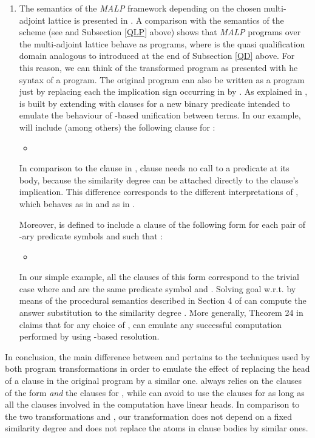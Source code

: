\documentclass{sigplanconf}
\newcommand{\MALP}{{\em MALP }}
\theoremstyle{definition}
\theoremstyle{plain}
\begin{document}
\begin{enumerate}
    \item The semantics of the \MALP framework depending on the chosen multi-adjoint lattice is presented in \cite{MOV04}. A comparison
with the semantics of the  scheme (see \cite{RR08} and Subsection \ref{QLP} above) shows that \MALP programs over the multi-adjoint lattice  behave as  programs, where  is the quasi qualification domain analogous to  introduced at the end of Subsection \ref{QD} above. For this reason, we can think of the transformed program  as presented with he syntax of a  program. The original program  can also be  written as a  program just by replacing each the implication sign  occurring  in  by . As explained in \cite{MOV04},  is built by extending  with clauses for  a new binary predicate  intended to emulate the behaviour of -based unification between terms. In our example,  will include (among others) the following clause
for :
    \begin{itemize}
        \item 
    \end{itemize}
In comparison to the clause   in , clause  needs no call to a  predicate at its body, because the similarity degree  can be attached directly to the clause's implication. This difference corresponds to the different interpretations of , which behaves as  in  and as  in .

Moreover,  is defined to include a clause of the following form for each pair of -ary predicate symbols  and  such that :
\begin{itemize}
    \item 
\end{itemize}
In our simple example, all the clauses of this form correspond to the trivial case where  and  are the same predicate symbol and . Solving goal  w.r.t. by means of the procedural semantics described in Section 4 of \cite{MOV04}
can compute the answer substitution  to the similarity degree . More generally, Theorem 24 in \cite{MOV04} claims that for any choice of ,  can emulate any successful computation performed by  using -based  resolution.
\end{enumerate}

In conclusion, the main difference between   and   pertains to the techniques used by both program transformations
in order to emulate the effect of replacing the head of a clause in the original program by a similar one.  always relies on the clauses of the form  {\em and}  the clauses for , while  can avoid to use the clauses for  as long as all the clauses involved in the computation have linear heads. In comparison to the two transformations  and , our transformation  does not depend on a fixed similarity degree  and does not replace the atoms in clause bodies by similar ones.
\end{document}
